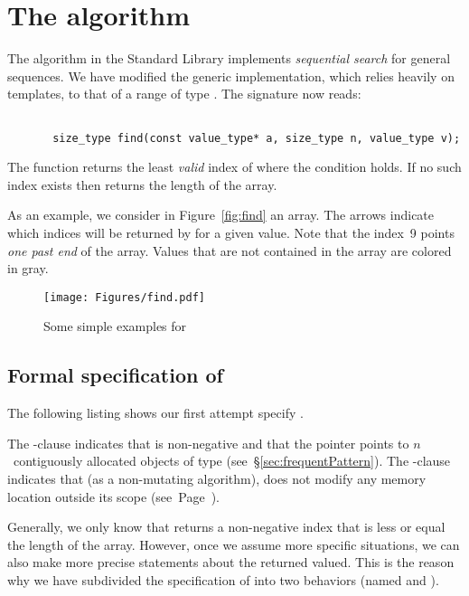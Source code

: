 
\section{The \find algorithm}

The \find algorithm in the \cxx Standard Library \cite[\S 28.5.5]{cxx-17-draft}
implements \emph{sequential search} for general sequences.
We have modified the generic implementation,
which relies heavily on \cxx templates, to that of a range of
type .
The signature now reads:

\begin{lstlisting}[style=acsl-block]

       size_type find(const value_type* a, size_type n, value_type v);
\end{lstlisting}

The function \find returns the least \emph{valid} index  of 
where the condition  holds. 
If no such index exists then \find returns the length  of the array.


As an example, we consider in Figure~\ref{fig:find} an array.
The arrows indicate which indices will be returned by \find for a given value.
Note that the index~9 points \emph{one past end} of the array.
Values that are not contained in the array are colored in gray.

\begin{figure}[hbt]
\centering
\texttt{[image: Figures/find.pdf]}
\caption{Some simple examples for \find}
\end{figure}

\FloatBarrier


\subsection{Formal specification of \find}

The following listing shows our first attempt specify .



The -clause indicates that  is non-negative and
that the pointer  points to $n$~contiguously allocated objects of type
 (see~\S\ref{sec:frequentPattern}).
%
The -clause indicates that \find (as a non-mutating algorithm),
does not modify any memory location outside its scope (see~Page~\pageref{assigns-clause}).

Generally, we only know that \find returns a non-negative index that is less or
equal the length of the array.
However, once we assume more specific situations,
we can also make more precise statements about the returned valued.
This is the reason why we have subdivided the specification of
\find into two behaviors (named  and ).

